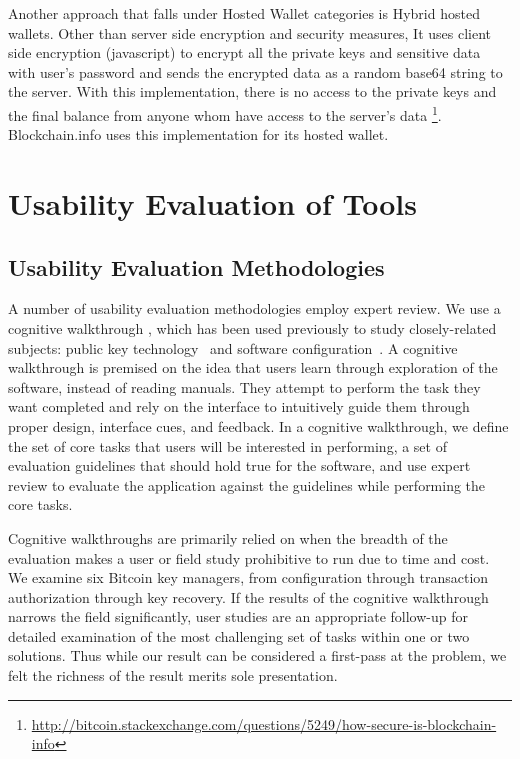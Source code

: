 Another approach that falls under Hosted Wallet categories is Hybrid hosted wallets. Other than server side encryption and security measures, It uses client side encryption (javascript) to encrypt all the private keys and sensitive data with user's password and sends the encrypted data as a random base64 string to the server. With this implementation, there is no access to the private keys and the final balance from anyone whom have access to the server's data \footnote{\url{http://bitcoin.stackexchange.com/questions/5249/how-secure-is-blockchain-info}}. Blockchain.info uses this implementation for its hosted wallet.


\section{Usability Evaluation of Tools}
\subsection{Usability Evaluation Methodologies}
A number of usability evaluation methodologies employ expert review. We use a cognitive walkthrough \cite{WRLP94}, which has been used previously to study closely-related subjects: public key technology~\cite{WT99} and software configuration~\cite{COA07}. A cognitive walkthrough is premised on the idea that users learn through exploration of the software, instead of reading manuals. They attempt to perform the task they want completed and rely on the interface to intuitively guide them through proper design, interface cues, and feedback. In a cognitive walkthrough, we define the set of core tasks that users will be interested in performing, a set of evaluation guidelines that should hold true for the software, and use expert review to evaluate the application against the guidelines while performing the core tasks. 

Cognitive walkthroughs are primarily relied on when the breadth of the evaluation makes a user or field study prohibitive to run due to time and cost. We examine six Bitcoin key managers, from configuration through transaction authorization through key recovery. If the results of the cognitive walkthrough narrows the field significantly, user studies are an appropriate follow-up for detailed examination of the most challenging set of tasks within one or two solutions. Thus while our result can be considered a first-pass at the problem, we felt the richness of the result merits sole presentation.

